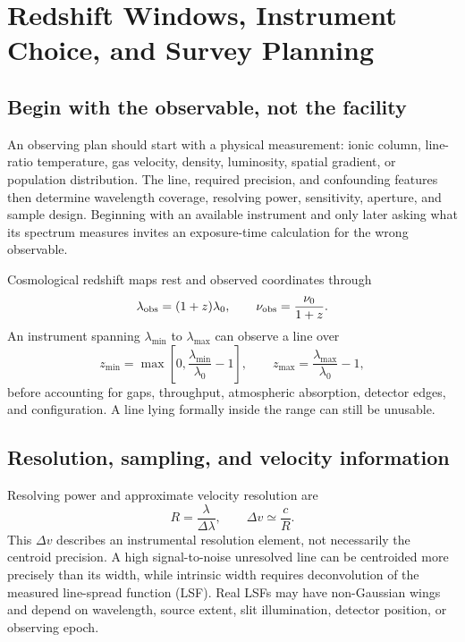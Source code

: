 \chapter{Redshift Windows, Instrument Choice, and Survey Planning}
\label{chap:observing-planning}

\section{Begin with the observable, not the facility}

An observing plan should start with a physical measurement: ionic column,
line-ratio temperature, gas velocity, density, luminosity, spatial gradient,
or population distribution. The line, required precision, and confounding
features then determine wavelength coverage, resolving power, sensitivity,
aperture, and sample design. Beginning with an available instrument and only
later asking what its spectrum measures invites an exposure-time calculation
for the wrong observable.

Cosmological redshift maps rest and observed coordinates through
\begin{equation}
 \lambda_{\rm obs}=(1+z)\lambda_0,\qquad
 \nu_{\rm obs}=\frac{\nu_0}{1+z}.
 \label{eq:redshift-window}
\end{equation}
An instrument spanning $\lambda_{\min}$ to $\lambda_{\max}$ can observe a
line over
\begin{equation}
 z_{\min}=\max\left[0,\frac{\lambda_{\min}}{\lambda_0}-1\right],
 \qquad
 z_{\max}=\frac{\lambda_{\max}}{\lambda_0}-1,
\end{equation}
before accounting for gaps, throughput, atmospheric absorption, detector
edges, and configuration. A line lying formally inside the range can still
be unusable.

\section{Resolution, sampling, and velocity information}

Resolving power and approximate velocity resolution are
\begin{equation}
 R=\frac{\lambda}{\Delta\lambda},\qquad
 \Delta v\simeq\frac{c}{R}.
\end{equation}
This $\Delta v$ describes an instrumental resolution element, not necessarily
the centroid precision. A high signal-to-noise unresolved line can be
centroided more precisely than its width, while intrinsic width requires
deconvolution of the measured line-spread function (LSF). Real LSFs may have
non-Gaussian wings and depend on wavelength, source extent, slit illumination,
detector position, or observing epoch.

